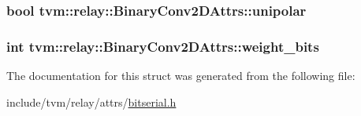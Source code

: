 \subsubsection[{\texorpdfstring{unipolar}{unipolar}}]{\setlength{\rightskip}{0pt plus 5cm}bool tvm\+::relay\+::\+Binary\+Conv2\+D\+Attrs\+::unipolar}\hypertarget{structtvm_1_1relay_1_1BinaryConv2DAttrs_a7e0ad68dce226079b769a678aa01dc49}{}\label{structtvm_1_1relay_1_1BinaryConv2DAttrs_a7e0ad68dce226079b769a678aa01dc49}
\subsubsection[{\texorpdfstring{weight\+\_\+bits}{weight_bits}}]{\setlength{\rightskip}{0pt plus 5cm}int tvm\+::relay\+::\+Binary\+Conv2\+D\+Attrs\+::weight\+\_\+bits}\hypertarget{structtvm_1_1relay_1_1BinaryConv2DAttrs_a70aa926aba4fc774c15786358315141a}{}\label{structtvm_1_1relay_1_1BinaryConv2DAttrs_a70aa926aba4fc774c15786358315141a}


The documentation for this struct was generated from the following file\+:\begin{DoxyCompactItemize}
\item 
include/tvm/relay/attrs/\hyperlink{bitserial_8h}{bitserial.\+h}\end{DoxyCompactItemize}
